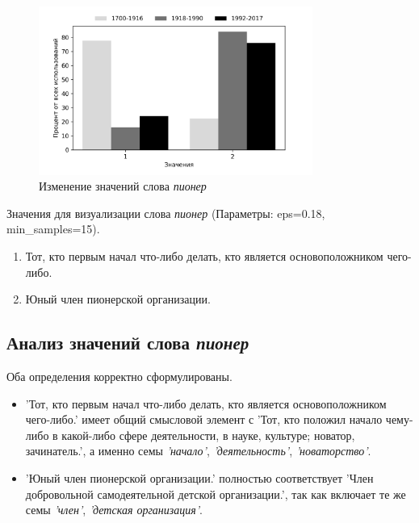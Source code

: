 \begin{figure}[H]
	\centering
	\includegraphics[width=0.8\textwidth]{img/visualizations/pioner_minimal}
	\caption{Изменение значений слова \textit{пионер}}
	\label{fig:Пионер}
\end{figure}

Значения для визуализации слова \textit{пионер} (Параметры: eps=0.18, min\_samples=15).

\begin{enumerate}
    \item Тот, кто первым начал что-либо делать, кто является основоположником чего-либо.
    \item Юный член пионерской организации.
\end{enumerate}

\subsection*{Анализ значений слова \textit{пионер}}

Оба определения корректно сформулированы.

\begin{itemize}
    \item ’Тот, кто первым начал что-либо делать, кто является основоположником чего-либо.’ имеет общий смысловой элемент с
’Тот, кто положил начало чему-либо в какой-либо сфере деятельности, в науке, культуре; новатор, зачинатель.’,
а именно семы \textit{’начало’}, \textit{’деятельность’}, \textit{’новаторство’}.

    \item ’Юный член пионерской организации.’ полностью соответствует
’Член добровольной самодеятельной детской организации.’, так как включает те же семы \textit{’член’}, \textit{’детская организация’}.
\end{itemize}

